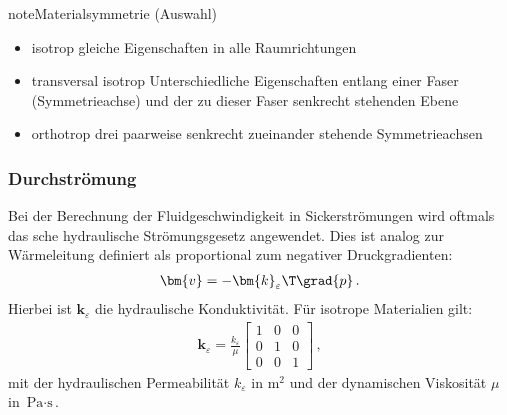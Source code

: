 \documentclass[letterpaper,10pt,german]{jupyterBook}
\begin{document}
\begin{sphinxadmonition}{note}{Materialsymmetrie (Auswahl)}
\begin{itemize}
\item {} 
\sphinxAtStartPar
isotrop \sphinxhyphen{} gleiche Eigenschaften in alle Raumrichtungen

\item {} 
\sphinxAtStartPar
transversal isotrop \sphinxhyphen{} Unterschiedliche Eigenschaften entlang einer Faser (Symmetrieachse) und der zu dieser Faser senkrecht stehenden Ebene

\item {} 
\sphinxAtStartPar
orthotrop \sphinxhyphen{} drei paarweise senkrecht zueinander stehende Symmetrieachsen

\end{itemize}
\end{sphinxadmonition}


\subsubsection{Durchströmung}
\label{\detokenize{chapters/chapter1/elasticity:durchstromung}}
\sphinxAtStartPar
Bei der Berechnung der Fluidgeschwindigkeit in Sickerströmungen wird oftmals das sche hydraulische Strömungsgesetz angewendet. Dies ist analog zur Wärmeleitung definiert als proportional zum negativer Druckgradienten:
\begin{equation}\label{equation:chapters/chapter1/elasticity:darcy}
\begin{split}\bm{v} = - \bm{k}_{\varepsilon}\T  \grad{p} \, .\end{split}
\end{equation}
\sphinxAtStartPar
Hierbei ist \(\bm{k}_{\varepsilon}\) die hydraulische Konduktivität. Für isotrope Materialien gilt:
\begin{equation*}
\begin{split} \bm{k}_{\varepsilon} = \frac{k_{\varepsilon}}{\mu} \begin{bmatrix} 1 & 0 & 0 \\ 0 & 1 & 0 \\ 0 & 0 & 1\end{bmatrix}  \, ,\end{split}
\end{equation*}
\sphinxAtStartPar
mit der hydraulischen Permeabilität \(k_{\varepsilon}\) in \(\text{m}^2\) und der dynamischen Viskosität \(\mu\) in \(\text{Pa}\cdot \text{s}\).
\end{document}
